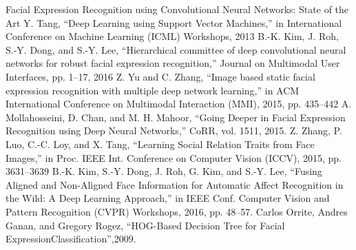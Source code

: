 \begin{enumerate}
 Facial Expression Recognition using Convolutional Neural Networks: State of the Art
Y. Tang, “Deep Learning using Support Vector Machines,” in International Conference on Machine Learning (ICML) Workshops, 2013
B.-K. Kim, J. Roh, S.-Y. Dong, and S.-Y. Lee, “Hierarchical committee
of deep convolutional neural networks for robust facial expression
recognition,” Journal on Multimodal User Interfaces, pp. 1–17, 2016
Z. Yu and C. Zhang, “Image based static facial expression recognition
with multiple deep network learning,” in ACM International Conference
on Multimodal Interaction (MMI), 2015, pp. 435–442
 A. Mollahosseini, D. Chan, and M. H. Mahoor, “Going Deeper in Facial
Expression Recognition using Deep Neural Networks,” CoRR, vol. 1511,
2015.
Z. Zhang, P. Luo, C.-C. Loy, and X. Tang, “Learning Social Relation
Traits from Face Images,” in Proc. IEEE Int. Conference on Computer
Vision (ICCV), 2015, pp. 3631–3639
 B.-K. Kim, S.-Y. Dong, J. Roh, G. Kim, and S.-Y. Lee, “Fusing Aligned
and Non-Aligned Face Information for Automatic Affect Recognition in
the Wild: A Deep Learning Approach,” in IEEE Conf. Computer Vision
and Pattern Recognition (CVPR) Workshops, 2016, pp. 48–57.
 Carlos Orrite, Andres Ganan, and Gregory Rogez, “HOG-Based Decision Tree for Facial ExpressionClassification”,2009.
\end{enumerate}
